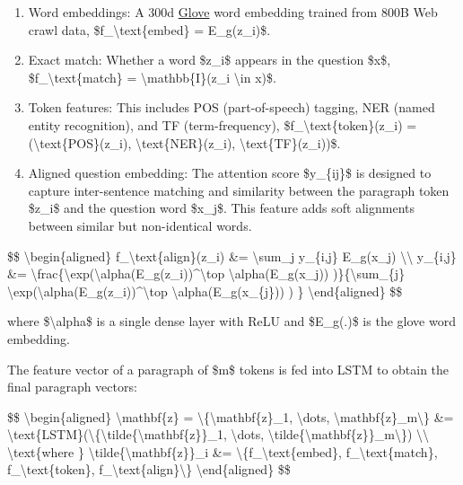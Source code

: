 \begin{enumerate}
\tightlist
\item
  Word embeddings: A 300d \href{https://lilianweng.github.io/posts/2017-10-15-word-embedding/\#glove-global-vectors}{Glove} word embedding trained from 800B Web crawl data, \$f\_\textbackslash text\{embed\} = E\_g(z\_i)\$.
\item
  Exact match: Whether a word \$z\_i\$ appears in the question \$x\$, \$f\_\textbackslash text\{match\} = \textbackslash mathbb\{I\}(z\_i \textbackslash in x)\$.
\item
  Token features: This includes POS (part-of-speech) tagging, NER (named entity recognition), and TF (term-frequency), \$f\_\textbackslash text\{token\}(z\_i) = (\textbackslash text\{POS\}(z\_i), \textbackslash text\{NER\}(z\_i), \textbackslash text\{TF\}(z\_i))\$.
\item
  Aligned question embedding: The attention score \$y\_\{ij\}\$ is designed to capture inter-sentence matching and similarity between the paragraph token \$z\_i\$ and the question word \$x\_j\$. This feature adds soft alignments between similar but non-identical words.
\end{enumerate}

\$\$ \textbackslash begin\{aligned\} f\_\textbackslash text\{align\}(z\_i) \&= \textbackslash sum\_j y\_\{i,j\} E\_g(x\_j) \textbackslash\textbackslash{} y\_\{i,j\} \&= \textbackslash frac\{\textbackslash exp(\textbackslash alpha(E\_g(z\_i))\^{}\textbackslash top \textbackslash alpha(E\_g(x\_j)) )\}\{\textbackslash sum\_\{j\textquotesingle\} \textbackslash exp(\textbackslash alpha(E\_g(z\_i))\^{}\textbackslash top \textbackslash alpha(E\_g(x\_\{j\textquotesingle\})) ) \} \textbackslash end\{aligned\} \$\$

where \$\textbackslash alpha\$ is a single dense layer with ReLU and \$E\_g(.)\$ is the glove word embedding.

The feature vector of a paragraph of \$m\$ tokens is fed into LSTM to obtain the final paragraph vectors:

\$\$ \textbackslash begin\{aligned\} \textbackslash mathbf\{z\} = \textbackslash\{\textbackslash mathbf\{z\}\_1, \textbackslash dots, \textbackslash mathbf\{z\}\_m\textbackslash\} \&= \textbackslash text\{LSTM\}(\textbackslash\{\textbackslash tilde\{\textbackslash mathbf\{z\}\}\_1, \textbackslash dots, \textbackslash tilde\{\textbackslash mathbf\{z\}\}\_m\textbackslash\}) \textbackslash\textbackslash{} \textbackslash text\{where \} \textbackslash tilde\{\textbackslash mathbf\{z\}\}\_i \&= \textbackslash\{f\_\textbackslash text\{embed\}, f\_\textbackslash text\{match\}, f\_\textbackslash text\{token\}, f\_\textbackslash text\{align\}\textbackslash\} \textbackslash end\{aligned\} \$\$

